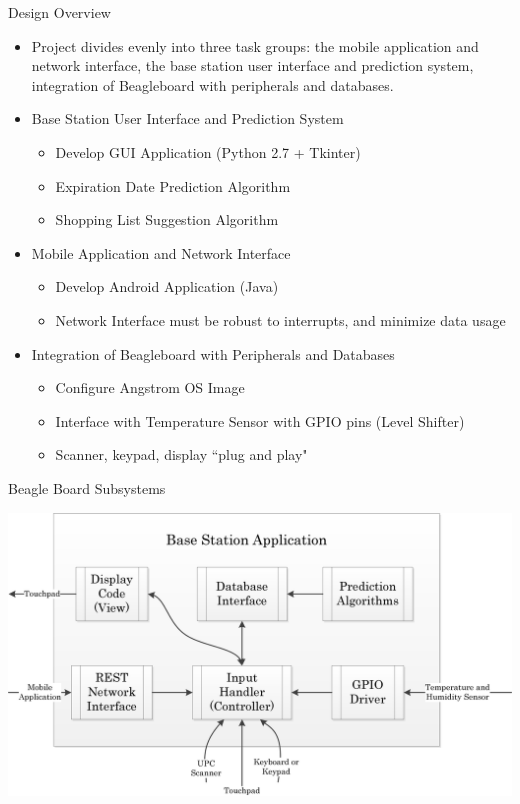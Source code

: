 \documentclass[t]{beamer}
\begin{document}
\begin{frame}{Design Overview}
\begin{itemize}
\item Project divides evenly into three task groups: the mobile application and network interface, the base station user interface and prediction system, integration of Beagleboard with peripherals and databases.
\item Base Station User Interface and Prediction System
\begin{itemize}
\item Develop GUI Application (Python 2.7 + Tkinter)
\item Expiration Date Prediction Algorithm
\item Shopping List Suggestion Algorithm
\end{itemize}
\item Mobile Application and Network Interface
\begin{itemize}
\item Develop Android Application (Java)
\item Network Interface must be robust to interrupts, and minimize data usage
\end{itemize}
\item Integration of Beagleboard with Peripherals and Databases
\begin{itemize}
\item Configure Angstrom OS Image
\item Interface with Temperature Sensor with GPIO pins (Level Shifter)
\item Scanner, keypad, display ``plug and play"
\end{itemize}
\end{itemize}
\end{frame}

\begin{frame}{Beagle Board Subsystems}
\begin{center}
\includegraphics[scale=0.65]{../Graphics/BaseStation}
\end{center}
\end{frame}
\end{document}
